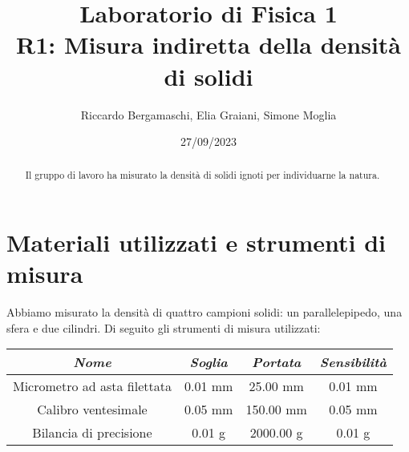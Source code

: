 \documentclass{article}
\title{
    Laboratorio di Fisica 1\\
    R1: Misura indiretta della densità di solidi
}
\author{Riccardo Bergamaschi, Elia Graiani, Simone Moglia}
\date{27/09/2023}
\begin{document}
\maketitle

\begin{abstract}
    Il gruppo di lavoro ha misurato la densità di solidi ignoti
    per individuarne la natura.
\end{abstract}

\section{Materiali utilizzati e strumenti di misura}
Abbiamo misurato la densità di quattro campioni solidi:
un parallelepipedo, una sfera e due cilindri.
Di seguito gli strumenti di misura utilizzati:

\begin{center}
    \begin{tabular}{ |c|c|c|c| }
        \hline
        \emph{Nome} & \emph{Soglia} & \emph{Portata} & \emph{Sensibilità} \\
        \hline
        Micrometro ad asta filettata & 0.01 mm & 25.00 mm & 0.01 mm \\
        Calibro ventesimale & 0.05 mm & 150.00 mm & 0.05 mm \\
        Bilancia di precisione & 0.01 g & 2000.00 g & 0.01 g \\
        \hline
    \end{tabular}
\end{center}

\end{document}
